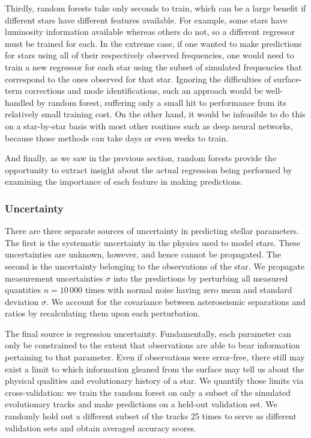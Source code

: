 \documentclass[manuscript,linenumbers]{aastex6}
\newif\ifref
\newcommand{\mb}[1]{\ifref\boldmath\textbf{#1}\unboldmath\else #1\fi}
\begin{document}
Thirdly, random forests take only seconds to train, which can be a large benefit if different stars have different \mb{features} available. For example, some stars have luminosity information available whereas others do not, so a different regressor must be trained for each. In the extreme case, if one wanted to make predictions for stars using all of their respectively observed frequencies, one would need to train a new regressor for each star using the subset of simulated frequencies that correspond to the ones observed for that star. Ignoring the difficulties of surface-term corrections and mode identifications, such an approach would be well-handled by random forest, suffering only a small hit to performance from its relatively small training cost. On the other hand, it would be infeasible to do this on a star-by-star basis with most other routines such as deep neural networks, because \mb{those} methods can take days or even weeks to train. 

And finally\mb{, as we saw in the previous section,} random forests provide the opportunity to extract insight about the actual regression being performed by examining the importance of each \mb{feature} in making predictions. 

\subsubsection{Uncertainty}
\label{sec:uncertainties}
There are three separate sources of uncertainty in predicting stellar parameters. The first is the systematic uncertainty in the physics used to model stars. These uncertainties are unknown, however, and hence cannot be propagated. The second is the uncertainty belonging to the observations of the star. We propagate measurement uncertainties $\sigma$ into the predictions by perturbing all measured quantities $n=10\,000$ times with normal noise having zero mean and standard deviation $\sigma$. We account for the covariance between asteroseismic separations and ratios by recalculating them upon each perturbation. 

The final source is regression uncertainty. Fundamentally, each parameter can only be constrained to the extent that observations are able to bear information pertaining to that parameter. Even if observations were error-free, there still may exist a limit to which information gleaned from the surface may tell us about the physical \mb{qualities} and evolutionary history of a star. We quantify those limits via cross-validation: we train the random forest on only a subset of the simulated evolutionary tracks and make predictions on a held-out validation set. We randomly hold out a different subset of the tracks 25 times to serve as different validation sets and obtain averaged accuracy scores.
\end{document}
